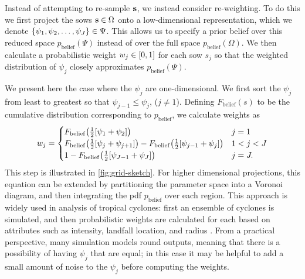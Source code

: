 \documentclass[11pt]{article}
\begin{document}
Instead of attempting to re-sample $\vb{s}$, we instead consider re-weighting.
To do this we first project the \glspl{sow} $\vb{s} \in \Omega$ onto a low-dimensional representation, which we denote $\qty{\psi_1, \psi_2, \ldots, \psi_J} \in \Psi$.
This allows us to specify a prior belief over this reduced space $p_\mathrm{belief}(\Psi)$ instead of over the full space $p_\mathrm{belief}(\Omega)$.
We then calculate a probabilistic weight $w_j \in \qty[0, 1]$ for each \gls{sow} $s_j$ so that the weighted distribution of $\psi_j$ closely approximates $p_\mathrm{belief}(\Psi)$.

We present here the case where the $\psi_j$ are one-dimensional.
We first sort the $\psi_j$  from least to greatest so that $\psi_{j-1} \leq \psi_j$, ($j \neq 1$).
Defining $F_\mathrm{belief}(s)$ to be the cumulative distribution corresponding to $p_\mathrm{belief}$, we calculate weights as
\begin{equation}\label{eq:weights}
    w_j = \begin{cases}
        F_\mathrm{belief}\qty(\frac{1}{2}\qty[\psi_1 + \psi_2])                                                                     & j = 1     \\
        F_\mathrm{belief}\qty(\frac{1}{2}\qty[\psi_{j} + \psi_{j+1}]) - F_\mathrm{belief}\qty(\frac{1}{2}\qty[\psi_{j-1} + \psi_j]) & 1 < j < J \\
        1 - F_\mathrm{belief}\qty(\frac{1}{2}\qty[\psi_{J-1} + \psi_J])                                                             & j = J.
    \end{cases}
\end{equation}
This step is illustrated in \cref{fig:grid-sketch}.
For higher dimensional projections, this equation can be extended by partitioning the parameter space into a Voronoi diagram, and then integrating the \gls{pdf} $p_\mathrm{belief}$ over each region.
This approach is widely used in analysis of tropical cyclones: first an ensemble of cyclones is simulated, and then probabilistic weights are calculated for each based on attributes such as intensity, landfall location, and radius \citep{johnson_clara:2013,resio_probabilities:2007,toro_jpm-os:2010}.
From a practical perspective, many simulation models round outputs, meaning that there is a possibility of having $\psi_j$ that are equal; in this case it may be helpful to add a small amount of noise to the $\psi_j$ before computing the weights.
\end{document}
